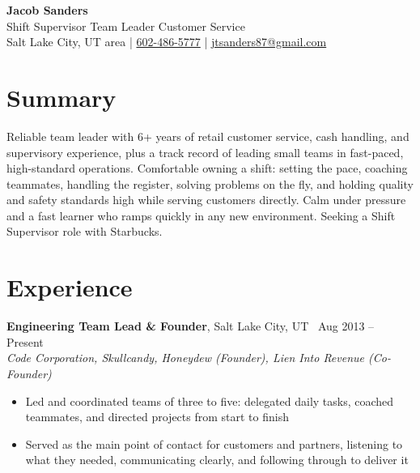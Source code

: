\documentclass[10.5pt, letterpaper]{article}
\newcommand{\jobentry}[4]{%
  \noindent
  \textbf{\color{accent}#1}\textcolor{muted}{, #2 \textbullet\ #4}\\
  \textit{#3}%
}
\begin{document}
\begin{center}
  {\fontsize{28}{32}\selectfont\bfseries\color{accent} Jacob Sanders}\\[5pt]
  {\large\color{muted} Shift Supervisor \enspace\textbullet\enspace Team Leader \enspace\textbullet\enspace Customer Service}\\[8pt]
  \small
  \faMapMarker*\enspace Salt Lake City, UT area
  \enspace\textcolor{accent}{|}\enspace
  \faPhone\enspace \href{tel:6024865777}{602-486-5777}
  \enspace\textcolor{accent}{|}\enspace
  \faEnvelope\enspace \href{mailto:jtsanders87@gmail.com}{jtsanders87@gmail.com}
\end{center}

\section{Summary}

Reliable team leader with 6+ years of retail customer service, cash handling, and
supervisory experience, plus a track record of leading small teams in fast-paced,
high-standard operations. Comfortable owning a shift: setting the pace, coaching
teammates, handling the register, solving problems on the fly, and holding quality
and safety standards high while serving customers directly. Calm under pressure and
a fast learner who ramps quickly in any new environment. Seeking a Shift Supervisor
role with Starbucks.

\section{Experience}

\jobentry{Engineering Team Lead \& Founder}{Salt Lake City, UT}%
  {Code Corporation, Skullcandy, Honeydew (Founder), Lien Into Revenue (Co-Founder)}{Aug 2013 -- Present}
\begin{itemize}
  \item Led and coordinated teams of three to five: delegated daily tasks, coached
        teammates, and directed projects from start to finish
  \item Served as the main point of contact for customers and partners, listening
        to what they needed, communicating clearly, and following through to deliver it
\end{itemize}

\vspace{3pt}
\end{document}

